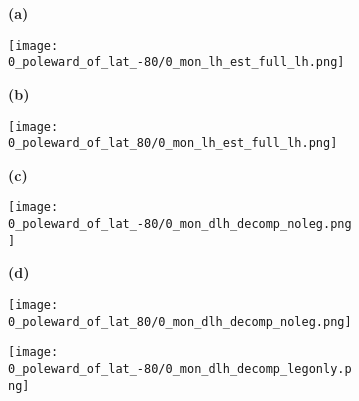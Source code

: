 \documentclass[preview]{standalone}
\begin{document}
\begin{figure}

  \begin{subfigure}[t]{0.05\textwidth}
    \textbf{\normalsize{(a)}}
  \end{subfigure}
  \begin{subfigure}[t]{0.45\textwidth}
    \texttt{[image: 0\_poleward\_of\_lat\_-80/0\_mon\_lh\_est\_full\_lh.png]}
  \end{subfigure}
  \begin{subfigure}[t]{0.05\textwidth}
    \textbf{\normalsize{(b)}}
  \end{subfigure}
  \begin{subfigure}[t]{0.45\textwidth}
    \texttt{[image: 0\_poleward\_of\_lat\_80/0\_mon\_lh\_est\_full\_lh.png]}
  \end{subfigure}

  \begin{subfigure}[t]{0.05\textwidth}
    \textbf{\normalsize{(c)}}
  \end{subfigure}
  \begin{subfigure}[t]{0.45\textwidth}
    \texttt{[image: 0\_poleward\_of\_lat\_-80/0\_mon\_dlh\_decomp\_noleg.png]}
  \end{subfigure}
  \begin{subfigure}[t]{0.05\textwidth}
    \textbf{\normalsize{(d)}}
  \end{subfigure}
  \begin{subfigure}[t]{0.45\textwidth}
    \texttt{[image: 0\_poleward\_of\_lat\_80/0\_mon\_dlh\_decomp\_noleg.png]}
  \end{subfigure}

  \begin{subfigure}[t]{0.33\textwidth}
    \hfill
  \end{subfigure}
  \begin{subfigure}[t]{0.45\textwidth}
    \texttt{[image: 0\_poleward\_of\_lat\_-80/0\_mon\_dlh\_decomp\_legonly.png]}
  \end{subfigure}

\end{figure}
\end{document}

